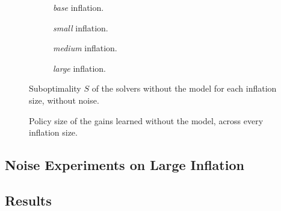 \begin{figure}[htbp]
  \centering
  \begin{subfigure}[t]{0.49\linewidth}
    \centering
    \caption{\emph{base} inflation.}
    \label{fig:ch4-identified-base-subopt}
  \end{subfigure}\hfill
  \begin{subfigure}[t]{0.49\linewidth}
    \centering
    \caption{\emph{small} inflation.}
    \label{fig:ch4-identified-small-subopt}
  \end{subfigure}

  \medskip
  \begin{subfigure}[t]{0.49\linewidth}
    \centering
    \caption{\emph{medium} inflation.}
    \label{fig:ch4-identified-medium-subopt}
  \end{subfigure}\hfill
  \begin{subfigure}[t]{0.49\linewidth}
    \centering
    \caption{\emph{large} inflation.}
    \label{fig:ch4-identified-large-subopt}
  \end{subfigure}
  \caption{Suboptimality $S$ of the solvers without the model for each inflation size,
    without noise.}
  \label{fig:ch4-identified-subopt}
\end{figure}

\begin{figure}[htbp]
  \centering
  \caption{Policy size of the gains learned without the model, across every inflation size.}
  \label{fig:ch4-identified-across-sizes-complexity}
\end{figure}

\subsection{Noise Experiments on Large Inflation}
\label{subsec:noise-large-inflation}

\subsection{Results}
\label{subsec:noise-results}

